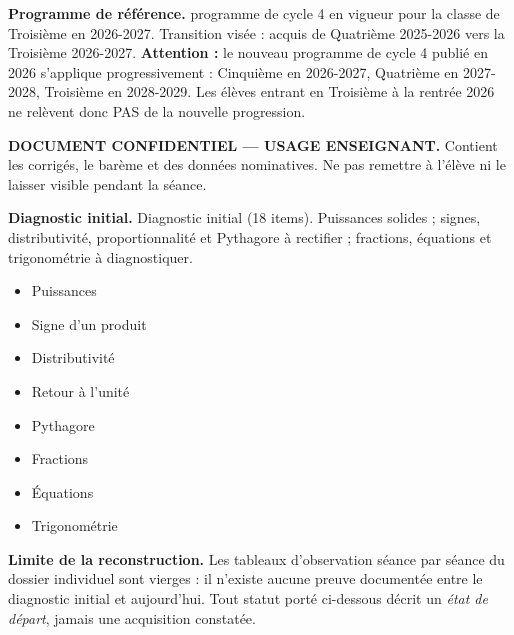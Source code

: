 \documentclass[10pt,a4paper]{article}
\begin{document}
\begin{methodbox}\small\textbf{Programme de référence.} programme de cycle 4 en vigueur pour la classe de Troisième en 2026-2027. Transition visée : acquis de Quatrième 2025-2026 vers la Troisième 2026-2027. \textbf{Attention :} le nouveau programme de cycle 4 publié en 2026 s'applique progressivement : Cinquième en 2026-2027, Quatrième en 2027-2028, Troisième en 2028-2029. Les élèves entrant en Troisième à la rentrée 2026 ne relèvent donc PAS de la nouvelle progression.\end{methodbox}
\begin{keybox}\textbf{DOCUMENT CONFIDENTIEL --- USAGE ENSEIGNANT.} Contient les corrigés, le barème et des données nominatives. Ne pas remettre à l'élève ni le laisser visible pendant la séance.\end{keybox}
\begin{methodbox}
\textbf{Diagnostic initial.} Diagnostic initial (18 items). Puissances solides ; signes, distributivité, proportionnalité et Pythagore à rectifier ; fractions, équations et trigonométrie à diagnostiquer.
\end{methodbox}
\begin{itemize}\item Puissances\end{itemize}
\begin{itemize}\item Signe d'un produit\item Distributivité\item Retour à l'unité\item Pythagore\item Fractions\item Équations\item Trigonométrie\end{itemize}
\begin{warningbox}\textbf{Limite de la reconstruction.} Les tableaux d'observation séance par séance du dossier individuel sont vierges : il n'existe aucune preuve documentée entre le diagnostic initial et aujourd'hui. Tout statut porté ci-dessous décrit un \emph{état de départ}, jamais une acquisition constatée.\end{warningbox}
\newpage{}
\end{document}
